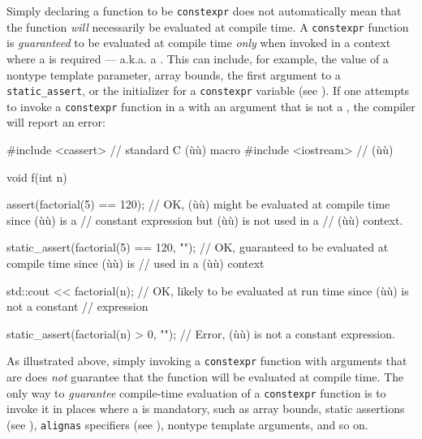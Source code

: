 Simply declaring a function to be \lstinline!constexpr! does not
automatically mean that the function \emph{will} necessarily be
evaluated at compile time. A \lstinline!constexpr! function is
\emph{guaranteed} to be evaluated at compile time \emph{only} when
invoked in a context where a  is required
--- a.k.a. a . This can include, for
example, the value of a nontype template parameter, array bounds, the
first argument to a \lstinline!static_assert!, or the initializer for a
\lstinline!constexpr! variable (see ). If one attempts to invoke a \lstinline!constexpr! function
in a  with an argument that is not a
, the compiler will report an error:

\begin{emcppslisting}[emcppsbatch=e2]
#include <cassert>   // standard C (ù{}ù) macro
#include <iostream>  // (ù{}ù)

void f(int n)
{
    assert(factorial(5) == 120);
        // OK, (ù{}ù) might be evaluated at compile time since (ù{}ù) is a
        // constant expression but (ù{}ù) is not used in a
        // (ù{}ù) context.

    static_assert(factorial(5) == 120, "");
        // OK, guaranteed to be evaluated at compile time since (ù{}ù) is
        // used in a (ù{}ù) context

    std::cout << factorial(n);
        // OK, likely to be evaluated at run time since (ù{}ù) is not a constant
        // expression

    static_assert(factorial(n) > 0, "");
        // Error, (ù{}ù) is not a constant expression.
}
\end{emcppslisting}


\noindent As illustrated above, simply invoking a \lstinline!constexpr! function with
arguments that are  does \emph{not}
guarantee that the function will be evaluated at compile time. The only
way to \emph{guarantee} compile-time evaluation of a \lstinline!constexpr!
function is to invoke it in places where a 
is mandatory, such as array bounds, static assertions (see ), \lstinline!alignas! specifiers (see
), nontype template arguments,
and so on.

